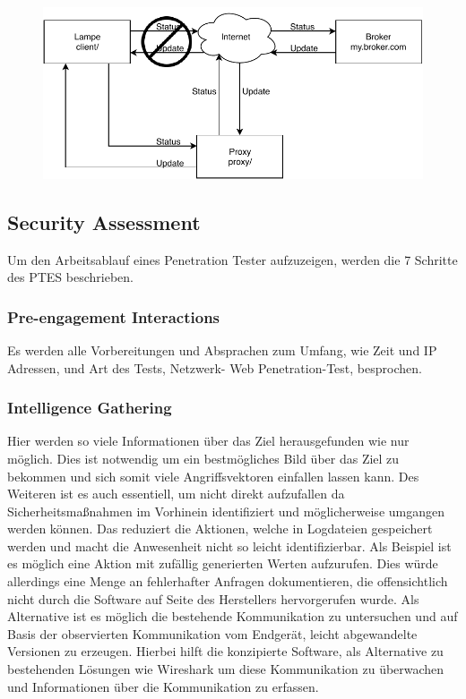         \begin{figure}[h]%
            \centering
            \includegraphics[width=14cm]{tex/bilder/2_grundlagen/Szenario1_MitM.pdf}
            \label{fig:szenario-mitm}
        \end{figure}
        
    \subsection{Security Assessment}
        Um den Arbeitsablauf eines Penetration Tester aufzuzeigen, werden die 7 Schritte des \ac{PTES} \cite{hsiangchih_2019} beschrieben.
    
    \subsubsection{\glqq Pre-engagement Interactions\grqq{}}
        Es werden alle Vorbereitungen und Absprachen zum Umfang, wie Zeit und IP Adressen, und Art des Tests, Netzwerk- Web Penetration-Test, besprochen.
    \subsubsection{\glqq Intelligence Gathering\grqq{}}
        Hier werden so viele Informationen über das Ziel herausgefunden wie nur möglich. Dies ist notwendig um ein bestmögliches Bild über das Ziel zu bekommen und sich somit viele Angriffsvektoren einfallen lassen kann. Des Weiteren ist es auch essentiell, um nicht direkt aufzufallen da Sicherheitsmaßnahmen im Vorhinein identifiziert und möglicherweise umgangen werden können. Das reduziert die Aktionen, welche in Logdateien gespeichert werden und macht die Anwesenheit nicht so leicht identifizierbar. Als Beispiel ist es möglich eine Aktion mit zufällig generierten Werten aufzurufen. Dies würde allerdings eine Menge an fehlerhafter Anfragen dokumentieren, die offensichtlich nicht durch die Software auf Seite des Herstellers hervorgerufen wurde. Als Alternative ist es möglich die bestehende Kommunikation zu untersuchen und auf Basis der observierten Kommunikation vom Endgerät, leicht abgewandelte Versionen zu erzeugen. Hierbei hilft die konzipierte Software, als Alternative zu bestehenden Lösungen wie Wireshark um diese Kommunikation zu überwachen und Informationen über die Kommunikation zu erfassen.
